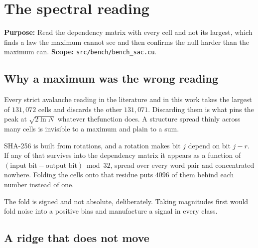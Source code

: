 \chapter{The spectral reading}

\textbf{Purpose:} Read the dependency matrix with every cell and not its largest, which finds a law the maximum cannot see and then confirms the null harder than the maximum can. \textbf{Scope:} \texttt{src/\allowbreak{}bench/\allowbreak{}bench\_\allowbreak{}sac.\allowbreak{}cu}.

\section{Why a maximum was the wrong reading}

Every strict avalanche reading in the literature and in this work takes the largest of \(131{,}072\) cells and discards the other \(131{,}071\). Discarding them is what pins the peak at \(\sqrt{2 \ln N}\) whatever thefunction does. A structure spread thinly across many cells is invisible to a maximum and plain to a sum.

SHA-256 is built from rotations, and a rotation makes bit \(j\) depend on bit \(j - r\). If any of that survives into the dependency matrix it appears as a function of \((\text{input bit} - \text{output bit}) \bmod 32\), spread over every word pair and concentrated nowhere. Folding the cells onto that residue puts \(4096\) of them behind each number instead of one.

The fold is signed and not absolute, deliberately. Taking magnitudes first would fold noise into a positive bias and manufacture a signal in every class.

\section{A ridge that does not move}

